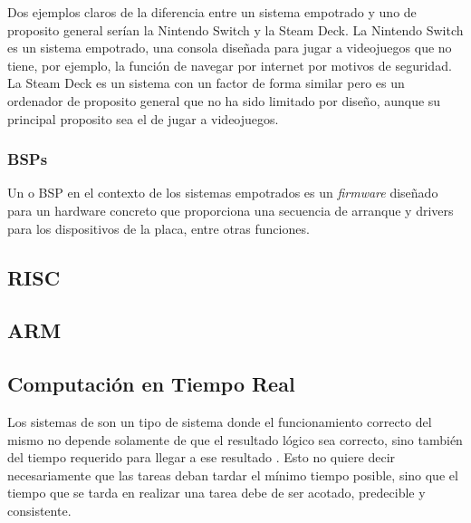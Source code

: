 Dos ejemplos claros de la diferencia entre un sistema empotrado y uno de proposito general serían la Nintendo Switch y la Steam Deck. La Nintendo Switch es un sistema empotrado, una consola diseñada para jugar a videojuegos que no tiene, por ejemplo, la función de navegar por internet por motivos de seguridad. La Steam Deck es un sistema con un factor de forma similar pero es un ordenador de proposito general que no ha sido limitado por diseño, aunque su principal proposito sea el de jugar a videojuegos.

%
%
%
%
%

\begin{center} \colorbox{yellow!10} {  } \end{center}

\subsubsection{BSPs}
Un  o BSP en el contexto de los sistemas empotrados es un \textit{firmware} diseñado para un hardware concreto que proporciona una secuencia de arranque y drivers para los dispositivos de la placa, entre otras funciones.

\subsection{RISC}

\subsection{ARM}

\subsection{Computación en Tiempo Real}
Los sistemas de  son un tipo de sistema donde el funcionamiento correcto del mismo no depende solamente de que el resultado lógico sea correcto, sino también del tiempo requerido para llegar a ese resultado \cite{stankovic}. Esto no quiere decir necesariamente que las tareas deban tardar el mínimo tiempo posible, sino que el tiempo que se tarda en realizar una tarea debe de ser acotado, predecible y consistente.

